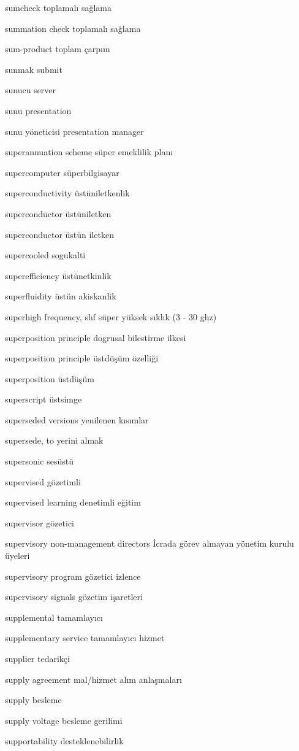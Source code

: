 \documentclass[12pt,fleqn]{article}\usepackage{../../common}
\begin{document}
sumcheck toplamalı sağlama

summation check toplamalı sağlama

sum-product toplam çarpım

sunmak submit

sunucu server

sunu presentation

sunu yöneticisi presentation manager

superannuation scheme süper emeklilik planı

supercomputer süperbilgisayar

superconductivity üstüniletkenlik

superconductor üstüniletken

superconductor üstün iletken

supercooled sogukalti

superefficiency üstünetkinlik

superfluidity üstün akiskanlik

superhigh frequency, shf süper yüksek sıklık (3 - 30 ghz)

superposition principle dogrusal bilestirme ilkesi

superposition principle üstdüşüm özelliği

superposition üstdüşüm

superscript üstsimge

superseded versions yenilenen kısımlar

supersede, to yerini almak

supersonic sesüstü

supervised gözetimli

supervised learning denetimli eğitim

supervisor gözetici

supervisory non-management directors İcrada görev almayan yönetim kurulu üyeleri

supervisory program gözetici izlence

supervisory signals gözetim işaretleri

supplemental tamamlayıcı

supplementary service tamamlayıcı hizmet

supplier tedarikçi

supply agreement mal/hizmet alım anlaşmaları

supply besleme

supply voltage besleme gerilimi

supportability desteklenebilirlik
\end{document}
